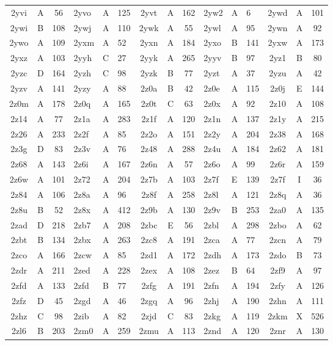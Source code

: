 \begin{longtable}{|c|c|c| a|a|a| c|c|c| a|a|a| c|c|c|}
2yvi & A & 56 & 2yvo & A & 125 & 2yvt & A & 162 & 2yw2 & A & 6 & 2ywd & A & 101\\
2ywi & B & 108 & 2ywj & A & 110 & 2ywk & A & 55 & 2ywl & A & 95 & 2ywn & A & 92\\
2ywo & A & 109 & 2yxm & A & 52 & 2yxn & A & 184 & 2yxo & B & 141 & 2yxw & A & 173\\
2yxz & A & 103 & 2yyh & C & 27 & 2yyk & A & 265 & 2yyv & B & 97 & 2yz1 & B & 80\\
2yzc & D & 164 & 2yzh & C & 98 & 2yzk & B & 77 & 2yzt & A & 37 & 2yzu & A & 42\\
2yzv & A & 141 & 2yzy & A & 88 & 2z0a & B & 42 & 2z0e & A & 115 & 2z0j & E & 144\\
2z0m & A & 178 & 2z0q & A & 165 & 2z0t & C & 63 & 2z0x & A & 92 & 2z10 & A & 108\\
2z14 & A & 77 & 2z1a & A & 283 & 2z1f & A & 120 & 2z1n & A & 137 & 2z1y & A & 215\\
2z26 & A & 233 & 2z2f & A & 85 & 2z2o & A & 151 & 2z2y & A & 204 & 2z38 & A & 168\\
2z3g & D & 83 & 2z3v & A & 76 & 2z48 & A & 288 & 2z4u & A & 184 & 2z62 & A & 181\\
2z68 & A & 143 & 2z6i & A & 167 & 2z6n & A & 57 & 2z6o & A & 99 & 2z6r & A & 159\\
2z6w & A & 101 & 2z72 & A & 204 & 2z7b & A & 103 & 2z7f & E & 139 & 2z7f & I & 36\\
2z84 & A & 106 & 2z8a & A & 96 & 2z8f & A & 258 & 2z8l & A & 121 & 2z8q & A & 36\\
2z8u & B & 52 & 2z8x & A & 412 & 2z9b & A & 130 & 2z9v & B & 253 & 2za0 & A & 135\\
2zad & D & 218 & 2zb7 & A & 208 & 2zbc & E & 56 & 2zbl & A & 298 & 2zbo & A & 62\\
2zbt & B & 134 & 2zbx & A & 263 & 2zc8 & A & 191 & 2zca & A & 77 & 2zcn & A & 79\\
2zco & A & 166 & 2zcw & A & 85 & 2zd1 & A & 172 & 2zdh & A & 173 & 2zdo & B & 73\\
2zdr & A & 211 & 2zed & A & 228 & 2zex & A & 108 & 2zez & B & 64 & 2zf9 & A & 97\\
2zfd & A & 133 & 2zfd & B & 77 & 2zfg & A & 191 & 2zfn & A & 194 & 2zfy & A & 126\\
2zfz & D & 45 & 2zgd & A & 46 & 2zgq & A & 96 & 2zhj & A & 190 & 2zhn & A & 111\\
2zhz & C & 98 & 2zib & A & 82 & 2zjd & C & 83 & 2zkg & A & 119 & 2zkm & X & 526\\
2zl6 & B & 203 & 2zm0 & A & 259 & 2zmu & A & 113 & 2znd & A & 120 & 2znr & A & 130\\

\end{longtable}
